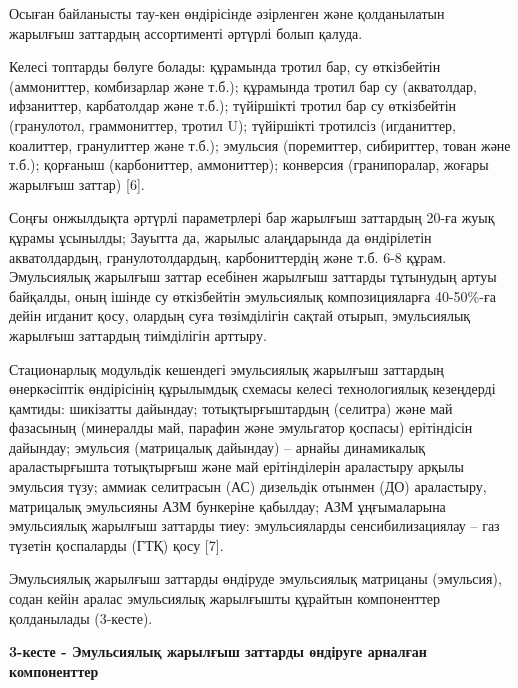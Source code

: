 Осыған байланысты тау-кен өндірісінде әзірленген және қолданылатын
жарылғыш заттардың ассортименті әртүрлі болып қалуда.

Келесі топтарды бөлуге болады: құрамында тротил бар, су өткізбейтін
(аммониттер, комбизарлар және т.б.); құрамында тротил бар су
(акватолдар, ифзаниттер, карбатолдар және т.б.); түйіршікті тротил бар
су өткізбейтін (гранулотол, граммониттер, тротил U); түйіршікті
тротилсіз (игданиттер, коалиттер, гранулиттер және т.б.); эмульсия
(поремиттер, сибириттер, тован және т.б.); қорғаныш (карбониттер,
аммониттер); конверсия (гранипоралар, жоғары жарылғыш заттар) {[}6{]}.

Соңғы онжылдықта әртүрлі параметрлері бар жарылғыш заттардың 20-ға жуық
құрамы ұсынылды; Зауытта да, жарылыс алаңдарында да өндірілетін
акватолдардың, гранулотолдардың, карбониттердің және т.б. 6-8 құрам.
Эмульсиялық жарылғыш заттар есебінен жарылғыш заттарды тұтынудың артуы
байқалды, оның ішінде су өткізбейтін эмульсиялық композицияларға
40-50\%-ға дейін игданит қосу, олардың суға төзімділігін сақтай отырып,
эмульсиялық жарылғыш заттардың тиімділігін арттыру.

Стационарлық модульдік кешендегі эмульсиялық жарылғыш заттардың
өнеркәсіптік өндірісінің құрылымдық схемасы келесі технологиялық
кезеңдерді қамтиды: шикізатты дайындау; тотықтырғыштардың (селитра) және
май фазасының (минералды май, парафин және эмульгатор қоспасы)
ерітіндісін дайындау; эмульсия (матрицалық дайындау) -- арнайы
динамикалық араластырғышта тотықтырғыш және май ерітінділерін араластыру
арқылы эмульсия түзу; аммиак селитрасын (АС) дизельдік отынмен (ДО)
араластыру, матрицалық эмульсияны АЗМ бункеріне қабылдау; АЗМ
ұңғымаларына эмульсиялық жарылғыш заттарды тиеу: эмульсияларды
сенсибилизациялау -- газ түзетін қоспаларды (ГТҚ) қосу {[}7{]}.

Эмульсиялық жарылғыш заттарды өндіруде эмульсиялық матрицаны (эмульсия),
содан кейін аралас эмульсиялық жарылғышты құрайтын компоненттер
қолданылады (3-кесте).

{\bfseries 3-кесте - Эмульсиялық жарылғыш заттарды өндіруге арналған
компоненттер}


